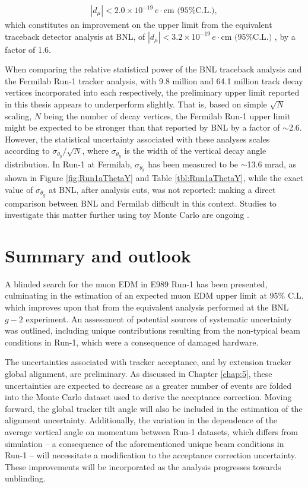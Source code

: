 %
\begin{align*}
    | d_{\mu} | <  2.0\times10^{-19} \,e\cdot\text{cm (95\% C.L.)},
\end{align*}
% 
which constitutes an improvement on the upper limit from the equivalent traceback detector analysis at BNL, of $| d_{\mu} | <  3.2\times10^{-19} \,e\cdot\text{cm (95\% C.L.)}$ \cite{BNLEDM}, by a factor of 1.6. 

When comparing the relative statistical power of the BNL traceback analysis and the Fermilab Run-1 tracker analysis, with 9.8 million and 64.1 million track decay vertices incorporated into each respectively, the preliminary upper limit reported in this thesis appears to underperform slightly. That is, based on simple $\sqrt{N}$ scaling, $N$ being the number of decay vertices, the Fermilab Run-1 upper limit might be expected to be stronger than that reported by BNL by a factor of $\sim$2.6. However, the statistical uncertainty associated with these analyses scales according to $\sigma_{\theta_{y}}/\sqrt{N}$, where $\sigma_{\theta_{y}}$ is the width of the vertical decay angle distribution. In Run-1 at Fermilab, $\sigma_{\theta_{y}}$ has been measured to be $\sim$13.6 mrad, as shown in Figure \ref{fig:Run1aThetaY} and Table \ref{tbl:Run1aThetaY}, while the exact value of $\sigma_{\theta_{y}}$ at BNL, after analysis cuts, was not reported: making a direct comparison between BNL and Fermilab difficult in this context. Studies to investigate this matter further using toy Monte Carlo are ongoing \cite{PriceUpdatedEDMLimits}.

\section{Summary and outlook}

A blinded search for the muon EDM in E989 Run-1 has been presented, culminating in the estimation of an expected muon EDM upper limit at 95\% C.L. which improves upon that from the equivalent analysis performed at the BNL $g-2$ experiment. An assessment of potential sources of systematic uncertainty was outlined, including unique contributions resulting from the non-typical beam conditions in Run-1, which were a consequence of damaged hardware. 

The uncertainties associated with tracker acceptance, and by extension tracker global alignment, are preliminary. As discussed in Chapter \ref{chap:5}, these uncertainties are expected to decrease as a greater number of events are folded into the Monte Carlo dataset used to derive the acceptance correction. Moving forward, the global tracker tilt angle will also be included in the estimation of the alignment uncertainty. Additionally, the variation in the dependence of the average vertical angle on momentum between Run-1 datasets, which differs from simulation -- a consequence of the aforementioned unique beam conditions in Run-1 -- will necessitate a modification to the acceptance correction uncertainty. These improvements will be incorporated as the analysis progresses towards unblinding.
